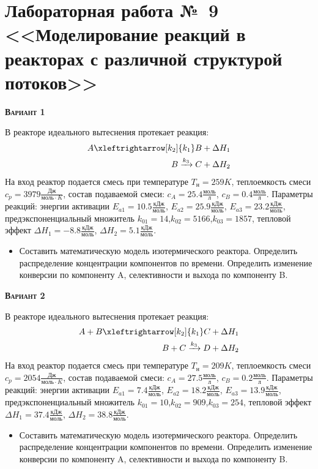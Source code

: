 \section {Лабораторная работа №~9 <<Моделирование реакций в реакторах с различной структурой потоков>>}

  \addtocounter{nlab}{1}\textsc{\textbf{Вариант 1}}

 В реакторе идеального вытеснения протекает реакция: \begin{equation*} \begin{aligned} A \xleftrightarrow[k_2]{k_1} B + \Delta H_1 \\ B \xrightarrow{k_3} C + \Delta H_2 \end{aligned} \end{equation*}                              На вход  реактор подается смесь при температуре $ T_{н} =  259 K$, теплоемкость смеси $c_p= 3979 \frac{Дж}{моль \cdot K}$, состав подаваемой смеси: $c_A=25.4 \frac{моль}{л}$, $c_B=0.4 \frac{моль}{л}$. Параметры реакций: энергии активации $E_{a1}=10.5 \frac{кДж}{моль}$, $E_{a2}=25.9  \frac{кДж}{моль}$, $E_{a3}=23.2  \frac{кДж}{моль}$, предэкспоненциальный множитель $k_{01}=        14$,$k_{02}=      5166$,$k_{03}=      1857$, тепловой эффект $\Delta H_1= -8.8  \frac{кДж}{моль}$, $\Delta H_2= 5.1 \frac{кДж}{моль}$.\begin{itemize} \item Составить математическую модель изотермического реактора. Определить распределение концентрации компонентов по времени. Определить изменение конверсии по компоненту A, селективности и выхода по компоненту B. \end{itemize}

\textsc{\textbf{Вариант 2}}

 В реакторе идеального вытеснения протекает реакция: \begin{equation*} \begin{aligned} A+B \xleftrightarrow[k_2]{k_1} C + \Delta H_1 \\ B + C \xrightarrow{k_3} D + \Delta H_2 \end{aligned} \end{equation*}                        На вход  реактор подается смесь при температуре $ T_{н} =  209 K$, теплоемкость смеси $c_p= 2054 \frac{Дж}{моль \cdot K}$, состав подаваемой смеси: $c_A=27.5 \frac{моль}{л}$, $c_B=0.2 \frac{моль}{л}$. Параметры реакций: энергии активации $E_{a1}= 7.4 \frac{кДж}{моль}$, $E_{a2}=18.2  \frac{кДж}{моль}$, $E_{a3}=13.9  \frac{кДж}{моль}$, предэкспоненциальный множитель $k_{01}=        10$,$k_{02}=       909$,$k_{03}=       254$, тепловой эффект $\Delta H_1= 37.4  \frac{кДж}{моль}$, $\Delta H_2=38.8 \frac{кДж}{моль}$.\begin{itemize} \item Составить математическую модель изотермического реактора. Определить распределение концентрации компонентов по времени. Определить изменение конверсии по компоненту A, селективности и выхода по компоненту B. \end{itemize}

